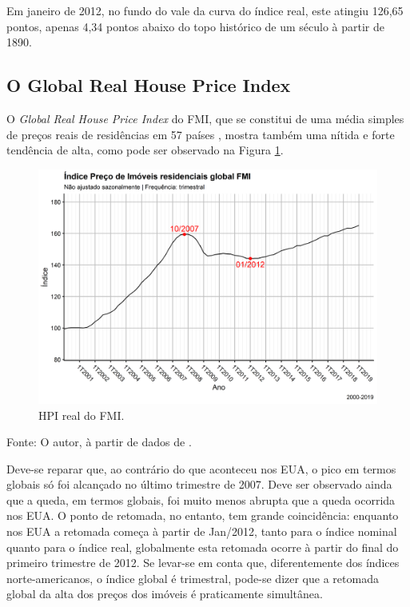 \documentclass[
	12pt,				%
	oneside,			%
	a4paper,			%
	chapter=TITLE,		%
	section=TITLE,		%
	english,			%
	brazil				%
	]{abntex2}
\newcommand{\bcenter}{\begin{center}}
\newcommand{\ecenter}{\end{center}}
\begin{document}
Em janeiro de 2012, no fundo do vale da curva do índice real, este atingiu
126,65 pontos, apenas
4,34 pontos abaixo do topo
histórico de um século à partir de 1890.

\hypertarget{o-global-real-house-price-index}{%
\subsection{O Global Real House Price Index}\label{o-global-real-house-price-index}}

O \emph{Global Real House Price Index} do \gls{FMI}, que se constitui de uma média
simples de preços reais de residências em 57 países \autocite{fmitwa}, mostra também uma
nítida e forte tendência de alta, como pode ser observado na Figura
\ref{fig:global-rhpi}.
\begin{figure}[H]

{\centering \includegraphics[width=0.7\linewidth]{images/global-rhpi-1} 

}

\caption{HPI real do FMI.}\label{fig:global-rhpi}
\end{figure}
\bcenter

Fonte: O autor, à partir de dados de \textcite{QuandlWIKI}.
\ecenter

Deve-se reparar que, ao contrário do que aconteceu nos EUA, o pico em termos
globais só foi alcançado no último trimestre de 2007. Deve ser observado ainda
que a queda, em termos globais, foi muito menos abrupta que a queda ocorrida
nos EUA. O ponto de retomada, no entanto, tem grande coincidência: enquanto nos
EUA a retomada começa à partir de Jan/2012, tanto para o índice nominal quanto
para o índice real, globalmente esta retomada ocorre à partir do final do
primeiro trimestre de 2012. Se levar-se em conta que, diferentemente dos índices
norte-americanos, o índice global é trimestral, pode-se dizer que a retomada
global da alta dos preços dos imóveis é praticamente simultânea.
\end{document}
